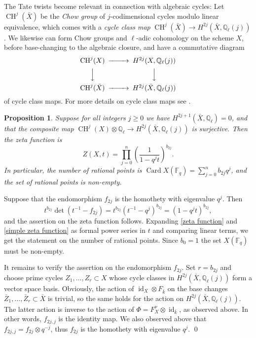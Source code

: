 \documentclass[oneside, 12pt]{amsart}
\newcommand\mylabel[1]{\label{#1}\marginpar{\vspace{-1ex}\medskip\medskip\footnotesize \tt #1}}
\renewcommand\mylabel[1]{\label{#1}}
\newtheorem{proposition}[theorem]{Proposition}
\theoremstyle{definition}
\theoremstyle{remark}
\newcommand{\QQ}{\mathbb{Q}}
\newcommand{\FF}{\mathbb{F}}
\newcommand{\Card}{\operatorname{Card}}
\newcommand{\CH}{\operatorname{CH}}
\newcommand{\id}{{\operatorname{id}}}
\newcommand{\ra}{\rightarrow}
\newcommand{\bk}{{\bar{k}}}
\newcommand{\bX}{{\bar{X}}}
\begin{document}
The Tate twists become   relevant in connection with algebraic cycles:
Let $\CH^j(\bX)$ be the \emph{Chow group} of $j$-codimensional cycles modulo linear equivalence, which comes with 
a \emph{cycle class map}  $\CH^j(\bX)\ra H^{2j}(\bX,\QQ_\ell(j))$. 
We likewise can form Chow groups and  $\ell$-adic cohomology on the scheme $X$, before base-changing to the algebraic closure,
and have a commutative diagram 
\begin{equation}
\label{cycle class maps}
\begin{CD}
\CH^j(X)	@>>> 	H^{2j}(X,\QQ_\ell(j))\\
@VVV			@VVV\\
\CH^j(\bX)	@>>> 	H^{2j}(\bX,\QQ_\ell(j))
\end{CD}
\end{equation}
of cycle class maps. For more details on cycle class maps see \cite{Deligne 1977}.

\begin{proposition}
\mylabel{generalization wedderburn}
Suppose for all integers $j\geq 0$ we have $H^{2j+1}(\bX,\QQ_\ell)=0$, and that the 
composite map $\CH^j(X)\otimes\QQ_\ell \ra H^{2j}(\bX,\QQ_\ell(j))$ is surjective.
Then the zeta function is
\begin{equation}
\label{simple zeta function}
Z(X,t) = \prod_{j=0}^{n}\left(\frac{1}{1-q^jt}\right)^{b_{2j}}.
\end{equation}
In particular, the number of rational points is $\Card X(\FF_q)= \sum_{j=0}^{n} b_{2j}q^j$, and  the set of rational points is non-empty.
\end{proposition}

\proof
Suppose  that the endomorphism $f_{2j}$ is the homothety with eigenvalue $q^j$. Then 
$$
t^{b_{2j}}\det(t^{-1}-f_{2j}) = t^{b_{2j}}(t^{-1}-q^j)^{b_{2j}} = (1- q^jt)^{b_{2j}},
$$
and the assertion on the zeta function follows. Expanding \eqref{zeta function} and \eqref{simple zeta function} 
as formal power series in $t$ and comparing linear terms, we get the statement on the number of rational points.
Since $b_0=1$ the set  $X(\FF_q)$ must be non-empty.

It remains to verify the assertion on the endomorphism $f_{2j}$. 
Set $r=b_{2j}$ and choose prime cycles $Z_1,\ldots,Z_r\subset X$ whose cycle classes in $H^{2j}(\bX,\QQ_\ell(j))$ form
a vector space basis. Obviously, the action of $\id_X\otimes F_\bk$ on the base changes $\bar{Z}_1,\ldots,\bar{Z}_r\subset\bX$ is trivial,
so  the same holds for the action on $H^{2j}(\bX,\QQ_\ell(j))$. The latter action is   inverse to the action of
$\Phi=F_X^\nu\otimes\id_\bk$, as observed above.  In other words, $f_{2j,j}$ is the identity map.
We also observed above that $f_{2j,j}=f_{2j}\otimes q^{-j}$, thus $f_{2j}$ is the homothety with eigenvalue $q^j$.
\qed
\end{document}
